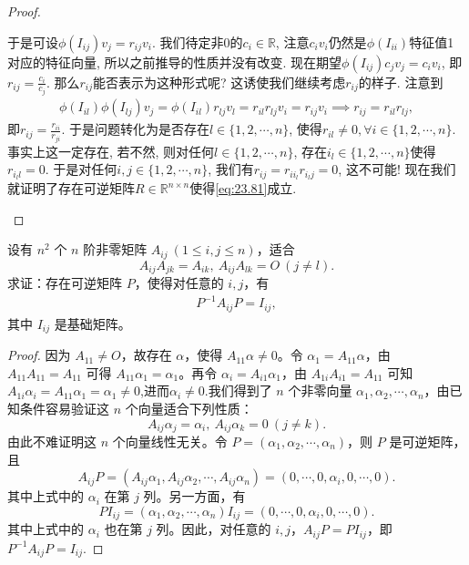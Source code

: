 \documentclass[../../main.tex]{subfiles}%
\begin{document}
\begin{proof}
\begin{enumerate}[(1)]
于是可设$\phi(I_{ij})v_j = r_{ij}v_i$. 我们待定非0的$c_i \in \mathbb{R}$, 注意$c_i v_i$仍然是$\phi(I_{ii})$特征值1对应的特征向量, 所以之前推导的性质并没有改变. 现在期望$\phi(I_{ij})c_j v_j = c_i v_i$, 即$r_{ij} = \frac{c_i}{c_j}$. 那么$r_{ij}$能否表示为这种形式呢? 这诱使我们继续考虑$r_{ij}$的样子.
注意到
\begin{align*}
\phi(I_{il})\phi(I_{lj})v_j = \phi(I_{il})r_{lj}v_l = r_{il}r_{lj}v_i = r_{ij}v_i \implies r_{ij} = r_{il}r_{lj},
\end{align*}
即$r_{ij} = \frac{r_{ii}}{r_{ji}}$. 于是问题转化为是否存在$l \in \{1,2,\cdots,n\}$, 使得$r_{il} \neq 0, \forall i \in \{1,2,\cdots,n\}$.
事实上这一定存在, 若不然, 则对任何$l \in \{1,2,\cdots,n\}$, 存在$i_l \in \{1,2,\cdots,n\}$使得$r_{i_l l} = 0$. 于是对任何$i,j \in \{1,2,\cdots,n\}$, 我们有$r_{ij} = r_{i i_l} r_{i_l j} = 0$, 这不可能! 现在我们就证明了存在可逆矩阵$R \in \mathbb{R}^{n \times n}$使得\eqref{eq:23.81}成立.
\end{enumerate}
\end{proof}

\begin{theorem}[基础矩阵的刻画]\label{theorem:非零相似于基础矩阵}
设有 $n^2$ 个 $n$ 阶非零矩阵 $A_{ij}\ (1 \leqslant  i,j \leqslant  n)$，适合
\[
A_{ij}A_{jk} = A_{ik},\ A_{ij}A_{lk} = O\ (j \neq l).
\]
求证：存在可逆矩阵 $P$，使得对任意的 $i,j$，有
\begin{align*}
P^{-1}A_{ij}P = I_{ij},
\end{align*}
其中 $I_{ij}$ 是基础矩阵。
\end{theorem}
\begin{proof}
因为 $A_{11} \neq O$，故存在 $\alpha$，使得 $A_{11}\alpha \neq 0$。令 $\alpha_1 = A_{11}\alpha$，由 $A_{11}A_{11} = A_{11}$ 可得 $A_{11}\alpha_1 = \alpha_1$。再令 $\alpha_i = A_{i1}\alpha_1$，由 $A_{1i}A_{i1} = A_{11}$ 可知 $A_{1i}\alpha_i=A_{11}\alpha_1=\alpha_1 \neq 0$,进而$\alpha_i\neq 0$.我们得到了 $n$ 个非零向量 $\alpha_1,\alpha_2,\cdots,\alpha_n$，由已知条件容易验证这 $n$ 个向量适合下列性质：
\[A_{ij}\alpha_j = \alpha_i,\ A_{ij}\alpha_k = 0\ (j \neq k).\]
由此不难证明这 $n$ 个向量线性无关。令 $P = (\alpha_1,\alpha_2,\cdots,\alpha_n)$，则 $P$ 是可逆矩阵，且
\[
A_{ij}P = (A_{ij}\alpha_1,A_{ij}\alpha_2,\cdots,A_{ij}\alpha_n) = (0,\cdots,0,\alpha_i,0,\cdots,0).
\]
其中上式中的 $\alpha_i$ 在第 $j$ 列。另一方面，有
\[
PI_{ij} = (\alpha_1,\alpha_2,\cdots,\alpha_n)I_{ij} = (0,\cdots,0,\alpha_i,0,\cdots,0).
\]
其中上式中的 $\alpha_i$ 也在第 $j$ 列。因此，对任意的 $i,j$，$A_{ij}P = PI_{ij}$，即 $P^{-1}A_{ij}P = I_{ij}$.
\end{proof}
\end{document}
